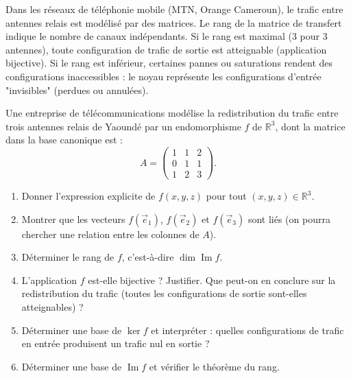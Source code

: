 \documentclass[11pt]{article}
\newcommand{\cle}[1]{{\popxbold\color{popdark}#1}}
\newcounter{popsec}
\newcounter{popsub}
\newcommand{\courssub}[1]{%
  \stepcounter{popsub}%
  \par\vspace{9pt}\noindent{\popxbold\fontsize{11.5}{13}\selectfont\color{popink}{\color{poporange}\thepopsec.\thepopsub}\hspace{6pt}#1}\par\nopagebreak\vspace{4pt}
}
\begin{document}
\courssub{Je me prépare au Bac}

\begin{savaistu}
Dans les réseaux de téléphonie mobile (MTN, Orange Cameroun), le trafic entre antennes relais est modélisé par des matrices. Le \cle{rang} de la matrice de transfert indique le nombre de canaux indépendants. Si le rang est maximal (3 pour 3 antennes), toute configuration de trafic de sortie est atteignable (application bijective). Si le rang est inférieur, certaines pannes ou saturations rendent des configurations inaccessibles : le noyau représente les configurations d'entrée "invisibles" (perdues ou annulées).
\end{savaistu}

\begin{exercice}
Une entreprise de télécommunications modélise la redistribution du trafic entre trois antennes relais de Yaoundé par un endomorphisme $f$ de $\mathbb{R}^3$, dont la matrice dans la base canonique est :
\[ A = \begin{pmatrix} 1 & 1 & 2 \\ 0 & 1 & 1 \\ 1 & 2 & 3 \end{pmatrix}. \]
\begin{enumerate}
\item Donner l'expression explicite de $f(x, y, z)$ pour tout $(x, y, z) \in \mathbb{R}^3$.
\item Montrer que les vecteurs $f(\vec{e}_1)$, $f(\vec{e}_2)$ et $f(\vec{e}_3)$ sont liés (on pourra chercher une relation entre les colonnes de $A$).
\item Déterminer le rang de $f$, c'est-à-dire $\dim \operatorname{Im} f$.
\item L'application $f$ est-elle bijective ? Justifier. Que peut-on en conclure sur la redistribution du trafic (toutes les configurations de sortie sont-elles atteignables) ?
\item Déterminer une base de $\ker f$ et interpréter : quelles configurations de trafic en entrée produisent un trafic nul en sortie ?
\item Déterminer une base de $\operatorname{Im} f$ et vérifier le théorème du rang.
\end{enumerate}
\end{exercice}
\end{document}
